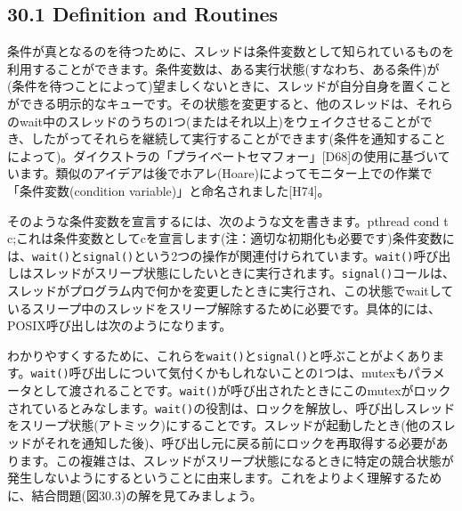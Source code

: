 \hypertarget{definition-and-routines}{%
\subsection*{30.1 Definition and
Routines}\label{definition-and-routines}}

条件が真となるのを待つために、スレッドは条件変数として知られているものを利用することができます。条件変数は、ある実行状態(すなわち、ある条件)が(条件を待つことによって)望ましくないときに、スレッドが自分自身を置くことができる明示的なキューです。その状態を変更すると、他のスレッドは、それらのwait中のスレッドのうちの1つ(またはそれ以上)をウェイクさせることができ、したがってそれらを継続して実行することができます(条件を通知することによって)。ダイクストラの「プライベートセマフォー」{[}D68{]}の使用に基づいています。類似のアイデアは後でホアレ(Hoare)によってモニター上での作業で「条件変数(condition
variable)」と命名されました{[}H74{]}。

そのような条件変数を宣言するには、次のような文を書きます。pthread cond t
c;これは条件変数としてcを宣言します(注：適切な初期化も必要です)条件変数には、\texttt{wait()}と\texttt{signal()}という2つの操作が関連付けられています。\texttt{wait()}呼び出しはスレッドがスリープ状態にしたいときに実行されます。\texttt{signal()}コールは、スレッドがプログラム内で何かを変更したときに実行され、この状態でwaitしているスリープ中のスレッドをスリープ解除するために必要です。具体的には、POSIX呼び出しは次のようになります。

\begin{Shaded}
\begin{Highlighting}[]
\end{Highlighting}
\end{Shaded}

わかりやすくするために、これらを\texttt{wait()}と\texttt{signal()}と呼ぶことがよくあります。\texttt{wait()}呼び出しについて気付くかもしれないことの1つは、mutexもパラメータとして渡されることです。\texttt{wait()}が呼び出されたときにこのmutexがロックされているとみなします。\texttt{wait()}の役割は、ロックを解放し、呼び出しスレッドをスリープ状態(アトミック)にすることです。スレッドが起動したとき(他のスレッドがそれを通知した後)、呼び出し元に戻る前にロックを再取得する必要があります。この複雑さは、スレッドがスリープ状態になるときに特定の競合状態が発生しないようにするということに由来します。これをよりよく理解するために、結合問題(図30.3)の解を見てみましょう。

